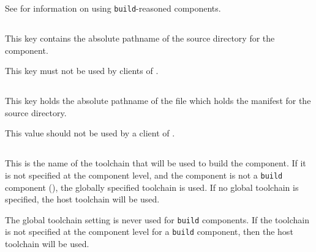   See  for information on using
  \texttt{build}-reasoned components.


\subsection{}\label{variables:source-directory}

This key contains the absolute pathname of the source directory for
the component.

This key must not be used by clients of \lmsbw.


\subsection{}\label{variables:source-mtree-manifest}

This key holds the absolute pathname of the file which holds the
\mtree manifest for the source directory.

This value should not be used by a client of \lmsbw.


\subsection{}\label{variables:toolchain}

This is the name of the toolchain that will be used to build the
component.  If it is not specified at the component level, and the
component is not a \texttt{build} component (),
the globally specified toolchain is used.  If no global toolchain is
specified, the host toolchain will be used.

The global toolchain setting is never used for \texttt{build}
components.  If the toolchain is not specified at the component level
for a \texttt{build} component, then the host toolchain will be used.

